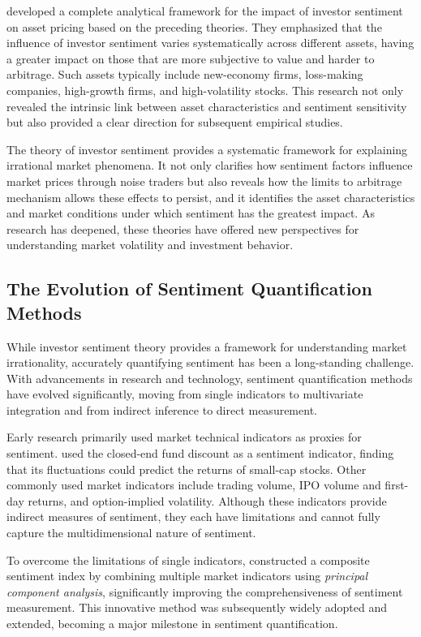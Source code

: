 \documentclass[AER]{AEA}
\begin{document}
\citet{baker2007investor} developed a complete analytical framework for the impact of investor sentiment on asset pricing based on the preceding theories. They emphasized that the influence of investor sentiment varies systematically across different assets, having a greater impact on those that are more subjective to value and harder to arbitrage. Such assets typically include new-economy firms, loss-making companies, high-growth firms, and high-volatility stocks. This research not only revealed the intrinsic link between asset characteristics and sentiment sensitivity but also provided a clear direction for subsequent empirical studies.

The theory of investor sentiment provides a systematic framework for explaining irrational market phenomena. It not only clarifies how sentiment factors influence market prices through noise traders but also reveals how the limits to arbitrage mechanism allows these effects to persist, and it identifies the asset characteristics and market conditions under which sentiment has the greatest impact. As research has deepened, these theories have offered new perspectives for understanding market volatility and investment behavior.

\subsection{The Evolution of Sentiment Quantification Methods}

While investor sentiment theory provides a framework for understanding market irrationality, accurately quantifying sentiment has been a long-standing challenge. With advancements in research and technology, sentiment quantification methods have evolved significantly, moving from single indicators to multivariate integration and from indirect inference to direct measurement.

Early research primarily used market technical indicators as proxies for sentiment. \citet{lee1991investor} used the closed-end fund discount as a sentiment indicator, finding that its fluctuations could predict the returns of small-cap stocks. Other commonly used market indicators include trading volume, IPO volume and first-day returns, and option-implied volatility. Although these indicators provide indirect measures of sentiment, they each have limitations and cannot fully capture the multidimensional nature of sentiment.

To overcome the limitations of single indicators, \citet{baker2006investor} constructed a composite sentiment index by combining multiple market indicators using \textit{principal component analysis}, significantly improving the comprehensiveness of sentiment measurement. This innovative method was subsequently widely adopted and extended, becoming a major milestone in sentiment quantification.
\end{document}
